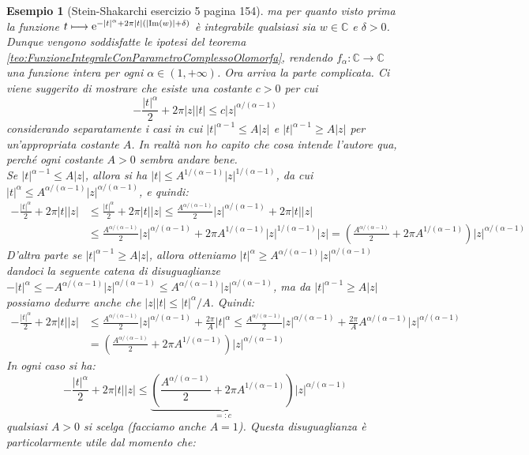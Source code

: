 \documentclass[11pt]{book}
\theoremstyle{Definizione}
\theoremstyle{TeoremaProposizioneLemmaCorollarioCongettura}
\theoremstyle{OsservazioneNotaEsempio}
\newtheorem{myes}{Esempio}[section]
\newcommand{\C}{\mathbb{C}}
\renewcommand{\Im}{\textup{Im}}
\newcommand{\e}{\textup{e}}
\begin{document}
\begin{myes}[Stein-Shakarchi esercizio 5 pagina 154]
ma per quanto visto prima la funzione $t \longmapsto \e^{-|t|^\alpha+2\pi |t|(|\Im(w)|+\delta)}$ è integrabile qualsiasi sia $w\in \C$ e $\delta > 0$. Dunque vengono soddisfatte le ipotesi del teorema \ref{teo:FunzioneIntegraleConParametroComplessoOlomorfa}, rendendo $f_\alpha:\C \longrightarrow \C$ una funzione intera per ogni $\alpha \in (1,+\infty)$. Ora arriva la parte complicata. Ci viene suggerito di mostrare che esiste una costante $c > 0$ per cui
$$
-\frac{|t|^\alpha}{2}+2\pi |z||t| \leq c |z|^{\alpha/(\alpha-1)}
$$
considerando separatamente i casi in cui $|t|^{\alpha-1} \leq A|z|$ e $|t|^{\alpha-1} \geq A|z|$ per un'appropriata costante $A$. In realtà non ho capito che cosa intende l'autore qua, perché ogni costante $A > 0$ sembra andare bene.\\
Se $|t|^{\alpha-1}\leq A|z|$, allora si ha $|t| \leq A^{1/(\alpha-1)} |z|^{1/(\alpha-1)}$, da cui $|t|^\alpha \leq A^{\alpha/(\alpha-1)} |z|^{\alpha/(\alpha-1)}$, e quindi:
\begin{align*}
-\frac{|t|^\alpha}{2}+2\pi |t||z| &\leq \frac{|t|^\alpha}{2}+2\pi |t| |z| \leq \frac{A^{\alpha/(\alpha-1)}}{2}|z|^{\alpha/(\alpha-1)} + 2\pi |t||z|\\
&\leq \frac{A^{\alpha/(\alpha-1)}}{2}|z|^{\alpha/(\alpha-1)} + 2\pi A^{1/(\alpha-1)}|z|^{1/(\alpha-1)}|z| = \left(\frac{A^{\alpha/(\alpha-1)}}{2}+2\pi A^{1/(\alpha-1)}\right)|z|^{\alpha/(\alpha-1)}
\end{align*}
D'altra parte se $|t|^{\alpha-1} \geq A|z|$, allora otteniamo $|t|^{\alpha}\geq A^{\alpha/(\alpha-1)} |z|^{\alpha/(\alpha-1)}$ dandoci la seguente catena di disuguaglianze $-|t|^\alpha\leq - A^{\alpha/(\alpha-1)} |z|^{\alpha/(\alpha-1)} \leq A^{\alpha/(\alpha-1)} |z|^{\alpha/(\alpha-1)}$, ma da $|t|^{\alpha-1}\geq A|z|$ possiamo dedurre anche che $|z||t|\leq |t|^{\alpha}/A$. Quindi:
\begin{align*}
-\frac{|t|^\alpha}{2}+2\pi |t||z| &\leq \frac{A^{\alpha/(\alpha-1)}}{2}|z|^{\alpha/(\alpha-1)} + \frac{2\pi}{A}|t|^\alpha \leq \frac{A^{\alpha/(\alpha-1)}}{2}|z|^{\alpha/(\alpha-1)} + \frac{2\pi}{A} A^{\alpha/(\alpha-1)} |z|^{\alpha/(\alpha-1)}\\
&= \left(\frac{A^{\alpha/(\alpha-1)}}{2}+2\pi A^{1/(\alpha-1)}\right)|z|^{\alpha/(\alpha-1)}
\end{align*}
In ogni caso si ha:
$$
-\frac{|t|^\alpha}{2}+2\pi |t||z|\leq \underbrace{\left(\frac{A^{\alpha/(\alpha-1)}}{2}+2\pi A^{1/(\alpha-1)}\right)}_{=: c}|z|^{\alpha/(\alpha-1)}
$$
qualsiasi $A > 0$ si scelga (facciamo anche $A = 1$). Questa disuguaglianza è particolarmente utile dal momento che:

\end{myes}
\end{document}
